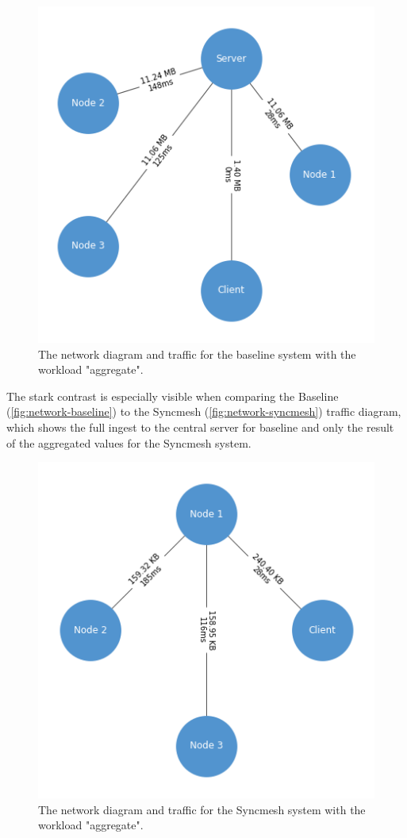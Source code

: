 \documentclass[conference]{IEEEtran}
\begin{document}
\begin{figure}[!h]
	\centering
	    \includegraphics[width=0.7\linewidth]{img/network_baseline-aggregate.png}
	\caption{The network diagram and traffic for the baseline system with the workload "aggregate".}
    \label{fig:network-baseline}
\end{figure}

The stark contrast is especially visible when comparing the Baseline (\autoref{fig:network-baseline}) to the Syncmesh (\autoref{fig:network-syncmesh}) traffic diagram, which shows the full ingest to the central server for baseline and only the result of the aggregated values for the Syncmesh system.

\begin{figure}[!h]
	\centering
		\includegraphics[width=0.7\linewidth]{img/network_syncmesh-aggregate.png}
	\caption{The network diagram and traffic for the Syncmesh system with the workload "aggregate".}
    \label{fig:network-syncmesh}
\end{figure}
\end{document}
